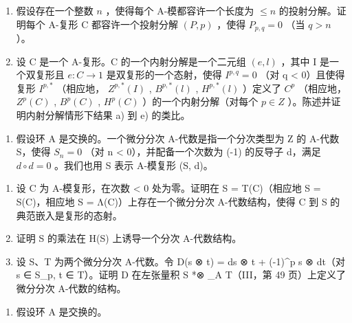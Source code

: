 \begin{enumerate}
\def\labelenumi{\alph{enumi})}
\setcounter{enumi}{4}
\item
  假设存在一个整数 \(n\) ，使得每个 A-模都容许一个长度为 \(\leqslant n\) 的投射分解。证明每个 A-复形 C 都容许一个投射分解 \((P, p)\) ，使得 \(P_{p,q} = 0\) （当 \(q > n\) ）。
\item
  设 C 是一个 A-复形。C 的一个内射分解是一个二元组 \((e, l)\) ，其中 I 是一个双复形且 \(e: C \to 1\) 是双复形的一个态射，使得 \(I^{p,q} = 0\) （对 q \textless{} 0）且使得复形 \(I^{p,*}\) （相应地， \(Z^{p,*}(I)\) , \(B^{p,*}(l)\) , \(H^{p,*}(l)\) ）定义了 \(C^{p}\) （相应地， \(Z^{p}(C)\) , \(B^{p}(C)\) , \(H^{p}(C)\) ）的一个内射分解（对每个 \(p \in Z\) ）。陈述并证明内射分解情形下结果 a) 到 e) 的类比。
\end{enumerate}

\begin{enumerate}
\def\labelenumi{\arabic{enumi})}
\setcounter{enumi}{17}
\tightlist
\item
  假设环 A 是交换的。一个微分分次 A-代数是指一个分次类型为 Z 的 A-代数 S，使得 \(S_{n} = 0\) （对 n \textless{} 0），并配备一个次数为 (-1) 的反导子 d，满足 \(d \circ d = 0\) 。我们也用 S 表示 A-模复形 (S, d)。
\end{enumerate}

\begin{enumerate}
\def\labelenumi{\alph{enumi})}
\item
  设 C 为 A-模复形，在次数 \textless{} 0 处为零。证明在 S = T(C)（相应地 S = S(C)，相应地 S = Λ(C)）上存在一个微分分次 A-代数结构，使得 C 到 S 的典范嵌入是复形的态射。
\item
  证明 S 的乘法在 H(S) 上诱导一个分次 A-代数结构。
\item
  设 S、T 为两个微分分次 A-代数。令 D(s ⊗ t) = ds ⊗ t + (-1)\^{}p s ⊗ dt（对 s ∈ S\_p, t ∈ T）。证明 D 在左张量积 S *⊗ \_A T（III，第 49 页）上定义了微分分次 A-代数的结构。
\end{enumerate}

\begin{enumerate}
\def\labelenumi{\arabic{enumi})}
\setcounter{enumi}{18}
\tightlist
\item
  假设环 A 是交换的。
\end{enumerate}

